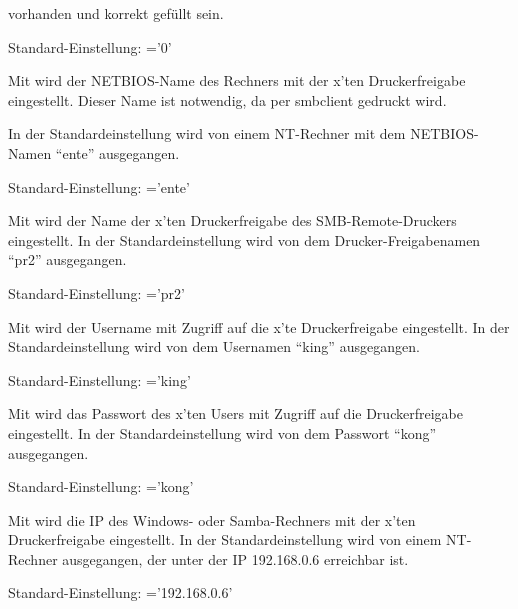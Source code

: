 \begin{description}
    vorhanden und korrekt gefüllt sein.

    Standard-Einstellung: ='0'



    Mit  wird der NETBIOS-Name des Rechners
    mit der x'ten Druckerfreigabe eingestellt. Dieser Name ist notwendig, da per
    smbclient gedruckt wird.

    In der Standardeinstellung wird von einem NT-Rechner mit dem NETBIOS-Namen
    ``ente'' ausgegangen.

    Standard-Einstellung: ='ente'



    Mit  wird der Name der x'ten
    Druckerfreigabe des SMB-Remote-Druckers eingestellt.
    In der Standardeinstellung wird von dem Drucker-Freigabenamen ``pr2''
    ausgegangen.

    Standard-Einstellung: ='pr2'



    Mit  wird der Username mit Zugriff auf
    die x'te Druckerfreigabe eingestellt.
    In der Standardeinstellung wird von dem Usernamen ``king'' ausgegangen.

    Standard-Einstellung: ='king'



    Mit  wird das Passwort des x'ten
    Users mit Zugriff auf die Druckerfreigabe eingestellt.
    In der Standardeinstellung wird von dem Passwort ``kong'' ausgegangen.

    Standard-Einstellung: ='kong'



    Mit  wird die IP des Windows- oder
    Samba-Rechners mit der x'ten Druckerfreigabe eingestellt.
    In der Standardeinstellung wird von einem NT-Rechner ausgegangen, der unter
    der IP 192.168.0.6 erreichbar ist.

    Standard-Einstellung: ='192.168.0.6'


\end{description}

